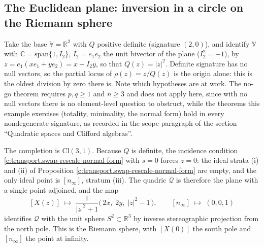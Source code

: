 \documentclass[11pt]{article}
\theoremstyle{definition}
\theoremstyle{plain}
\providecommand{\C}{}\renewcommand{\C}{\mathbb{C}}
\providecommand{\Cl}{}\renewcommand{\Cl}{\mathrm{Cl}}
\providecommand{\R}{}\renewcommand{\R}{\mathbb{R}}
\providecommand{\nInf}{}\renewcommand{\nInf}{n_\infty}
\begin{document}
\subsection*{The Euclidean plane: inversion in a circle on the Riemann sphere}
\label{c:note.transport.setting-euclidean-plane-inversion-circle-riemann}
Take the base $\mathbb{V} = \R^2$ with $Q$ positive definite (signature $(2,0)$), and identify $\mathbb{V}$ with $\C = \mathrm{span}\{1, I_{2}\}$, $I_{2} = e_{1}e_{2}$ the unit bivector of the plane ($I_{2}^{2} = -1$), by $z = e_{1}(xe_{1} + ye_{2}) = x + I_{2}y$, so that $Q(z) = |z|^2$. Definite signature has no null vectors, so the partial locus of $\rho(z) = z/Q(z)$ is the origin alone: this is the oldest division by zero there is. Note which hypotheses are at work. The no-go theorem requires $p, q \geq 1$ and $n \geq 3$ and does not apply here, since with no null vectors there is no element-level question to obstruct, while the theorems this example exercises (totality, minimality, the normal form) hold in every nondegenerate signature, as recorded in the scope paragraph of the section ``Quadratic spaces and Clifford algebras''.

The completion is $\Cl(3,1)$. Because $Q$ is definite, the incidence condition \ref{c:transport.swap-rescale-normal-form} with $s = 0$ forces $z = 0$: the ideal strata (i) and (ii) of Proposition \ref{c:transport.swap-rescale-normal-form} are empty, and the only ideal point is $[\nInf]$, stratum (iii). The quadric $\mathcal{Q}$ is therefore the plane with a single point adjoined, and the map
\[
[X(z)] \;\mapsto\; \frac{1}{|z|^2+1}\bigl(\,2x,\; 2y,\; |z|^2 - 1\,\bigr), \qquad [\nInf] \;\mapsto\; (0,0,1)
\]
identifies $\mathcal{Q}$ with the unit sphere $S^2 \subset \R^3$ by inverse stereographic projection from the north pole. This is the Riemann sphere, with $[X(0)]$ the south pole and $[\nInf]$ the point at infinity.
\end{document}
